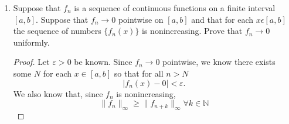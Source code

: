 \documentclass{article}
\begin{document}
\begin{enumerate}
\begin{proof}
                  \begin{equation}
                        \lvert f_N(x)-f_N(x_o)\rvert < \frac{\varepsilon}{3}
                        \text{ if } \lvert x-x_o\rvert < \delta.
                        \label{eq:5.2_7_continuous}
                  \end{equation}
                  Using \eqref{eq:5.2_7_uniformConvergence} and
                  \eqref{eq:5.2_7_continuous}, we can show that
                  \begin{align*}
                        \lvert f(x)-f(x_o)\rvert & = \lvert f_N(x)-f(x)+f_N(x)-f_N(x_o)+f_N(x_o)-f(x_o)\rvert                              \\
                                                 & \leq \lvert f_N(x)-f(x)\rvert+\lvert f_N(x)-f_N(x_o)\lvert+\rvert f_N(x_o)-f(x_o)\rvert \\
                                                 & < \frac{\varepsilon}{3} + \frac{\varepsilon}{3} + \frac{\varepsilon}{3}                 \\
                                                 & = \varepsilon.
                  \end{align*}
                  Therefore, $f$ must be continuous since $\lvert f(x)-f(x_o)\rvert<\varepsilon$.
            \end{proof}
            \setcounter{enumi}{14}
      \item Suppose that ${f_n}$ is a sequence of continuous functions on a
            finite interval $[a,b]$. Suppose that $f_n\to 0$ pointwise
            on $[a,b]$ and that for each $x\epsilon [a,b]$ the sequence of
            numbers $\{f_n(x)\}$ is nonincreasing. Prove that $f_n\to 0$
            uniformly.
            \begin{proof}
                  Let $\varepsilon>0$ be known. Since $f_n\to 0$ pointwise,
                  we know there exists some $N$ for each $x\in[a,b]$ so that for
                  all $n>N$
                  \begin{equation}
                        \lvert f_n(x)-0\rvert<\varepsilon.
                        \label{eq:5.2_15_pointwiseConvergence}
                  \end{equation}
                  We also know that, since $f_n$ is nonincreasing,
                  \begin{equation}
                        \lVert f_n\rVert_\infty \geq \lVert f_{n+k}\rVert_\infty \forall k\in\mathbb{N}
                        \label{eq:5.2_15_nonincreasing}

\end{equation}
\end{proof}
\end{enumerate}
\end{document}
